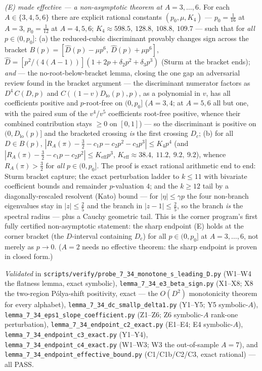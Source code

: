 \documentclass[
]{article}
\begin{document}
\emph{(E) made effective --- a non-asymptotic theorem at $A=3,\dots,6$.} For
each $A\in\{3,4,5,6\}$ there are explicit rational constants $(p_0,\mu,K_4)$
--- $p_0=\tfrac1{16}$ at $A=3$, $p_0=\tfrac1{12}$ at $A=4,5,6$;
$K_4\approx598.5,\ 128.8,\ 108.8,\ 109.7$ --- such that for \emph{all}
$p\in(0,p_0]$: (a) the reduced-cubic discriminant provably changes sign across
the bracket $B(p)=[\hat D(p)-\mu p^6,\ \hat D(p)+\mu p^6]$,
$\hat D=[p^2/(4(A-1))](1+2p+\delta_2p^2+\delta_3p^3)$ (Sturm at the bracket
ends); \emph{and} --- the no-root-below-bracket lemma, closing the one gap an
adversarial review found in the bracket argument --- the discriminant
numerator factors as $D^4\,C(D,p)$ and $C((1-v)D_{\mathrm{lo}}(p),p)$, as a
polynomial in $v$, has all coefficients positive and $p$-root-free on
$(0,p_0]$ ($A=3,4$; at $A=5,6$ all but one, with the paired sum of the $v^4$/$v^5$
coefficients root-free positive, whence their combined contribution stays
$\ge0$ on $[0,1]$) --- so the discriminant is positive on $(0,D_{\mathrm{lo}}(p)]$ and
the bracketed crossing \emph{is} the first crossing $D_c$; (b) for all $D\in
B(p)$, $|R_A(\pi)-\tfrac32-c_1p-c_2p^2-c_3p^3|\le K_4p^4$ (and
$|R_A(\pi)-\tfrac32-c_1p-c_2p^2|\le K_{\mathrm{eff}}p^3$,
$K_{\mathrm{eff}}\approx38.4,\ 11.2,\ 9.2,\ 9.2$), whence
$R_A(\pi)>\tfrac32$ for \emph{all} $p\in(0,p_0]$. The proof is exact rational
arithmetic end to end: Sturm bracket capture; the exact perturbation ladder to
$k\le11$ with bivariate coefficient bounds and remainder $p$-valuation $4$;
and the $k\ge12$ tail by a diagonally-rescaled resolvent (Kato) bound --- for
$|\eta|\le\gamma p$ the four non-branch eigenvalues stay in $|z|\le\tfrac25$
and the branch in $|z-1|\le\tfrac25$, so the branch \emph{is} the spectral
radius --- plus a Cauchy geometric tail. This is the corner program's first
fully certified non-asymptotic statement: the sharp endpoint (E) holds at the corner
bracket (the $D$-interval containing $D_c$) for all $p\in(0,p_0]$ at
$A=3,\dots,6$, not merely as $p\to0$. ($A=2$ needs no
effective theorem: the sharp endpoint is proven in closed form.)

\emph{Validated} in
\texttt{scripts/verify/probe\_7\_34\_monotone\_s\_leading\_D.py} (W1--W4 the
flatness lemma, exact symbolic),
\texttt{lemma\_7\_34\_e3\_beta\_sign.py} (X1--X8; X8 the two-region
P\'olya-shift positivity, exact --- the $O(D^2)$ monotonicity theorem for
every alphabet),
\texttt{lemma\_7\_34\_dc\_smallp\_delta1.py} (Y1--Y5; Y5 symbolic-$A$),
\texttt{lemma\_7\_34\_eps1\_slope\_coefficient.py} (Z1--Z6; Z6 symbolic-$A$
rank-one perturbation),
\texttt{lemma\_7\_34\_endpoint\_c2\_exact.py} (E1--E4; E4 symbolic-$A$),
\texttt{lemma\_7\_34\_endpoint\_c3\_exact.py} (Y1--Y4),
\texttt{lemma\_7\_34\_endpoint\_c4\_exact.py} (W1--W3; W3 the out-of-sample
$A=7$), and
\texttt{lemma\_7\_34\_endpoint\_effective\_bound.py} (C1/C1b/C2/C3, exact
rational) --- all PASS.
\end{document}
